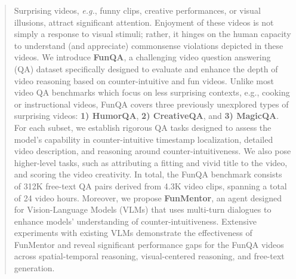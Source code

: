 \begin{abstract}
Surprising videos, \emph{e.g.}, funny clips, creative performances, or visual illusions, attract significant attention. Enjoyment of these videos is not simply a response to visual stimuli; rather, it hinges on the human capacity to understand (and appreciate) commonsense violations depicted in these videos.
We introduce \textbf{FunQA}, a challenging video question answering (QA) dataset specifically designed to evaluate and enhance the depth of video reasoning based on counter-intuitive and fun videos. Unlike most video QA benchmarks which focus on less surprising contexts, e.g., cooking or instructional videos, FunQA covers three previously unexplored types of surprising videos: \textbf{1) HumorQA}, \textbf{2) CreativeQA}, and \textbf{3) MagicQA}.
For each subset, we establish rigorous QA tasks designed to assess the model's capability in counter-intuitive timestamp localization, detailed video description, and reasoning around counter-intuitiveness.
We also pose higher-level tasks, such as attributing a fitting and vivid title to the video, and scoring the video creativity.
In total, the FunQA benchmark consists of 312K free-text QA pairs derived from 4.3K video clips, spanning a total of 24 video hours.
Moreover, we propose \textbf{FunMentor}, an agent designed for Vision-Language Models (VLMs) that uses multi-turn dialogues to enhance models' understanding of counter-intuitiveness. Extensive experiments with existing VLMs demonstrate the effectiveness of FunMentor and reveal significant performance gaps for the FunQA videos across spatial-temporal reasoning, visual-centered reasoning, and free-text generation.
\end{abstract} 

